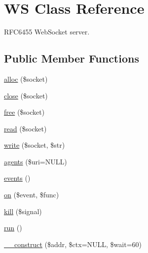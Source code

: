 \hypertarget{class_c_l_i_1_1_w_s}{}\section{WS Class Reference}
\label{class_c_l_i_1_1_w_s}


R\+F\+C6455 Web\+Socket server.  


\subsection*{Public Member Functions}
\begin{DoxyCompactItemize}
\item 
\hyperlink{class_c_l_i_1_1_w_s_a201f40e4b8683b5e569b4c1e8add9fcd}{alloc} (\$socket)
\item 
\hyperlink{class_c_l_i_1_1_w_s_aa3a3bd26af1b767091f521a6c9041e56}{close} (\$socket)
\item 
\hyperlink{class_c_l_i_1_1_w_s_a6b8891e0c2b12c863512071111b9aa07}{free} (\$socket)
\item 
\hyperlink{class_c_l_i_1_1_w_s_a845d775219b4327eb7cb626ffb1c2af3}{read} (\$socket)
\item 
\hyperlink{class_c_l_i_1_1_w_s_ac95ce2fb30c44bae1927b0107756f7e3}{write} (\$socket, \$str)
\item 
\hyperlink{class_c_l_i_1_1_w_s_a5c3b4aef24eacefe766d9e34fd5791de}{agents} (\$uri=N\+U\+LL)
\item 
\hyperlink{class_c_l_i_1_1_w_s_ade509b07f1df45730d31589b81a26efb}{events} ()
\item 
\hyperlink{class_c_l_i_1_1_w_s_a65a51fe8cfc1c6b4d04178b209b50e23}{on} (\$event, \$func)
\item 
\hyperlink{class_c_l_i_1_1_w_s_a2e5652a68528b58bda9e63311cd473bd}{kill} (\$signal)
\item 
\hyperlink{class_c_l_i_1_1_w_s_afb0fafe7e02a3ae1993c01c19fad2bae}{run} ()
\item 
\hyperlink{class_c_l_i_1_1_w_s_a19dbb10de3a82395f1c941e3f37fe8c7}{\+\_\+\+\_\+construct} (\$addr, \$ctx=N\+U\+LL, \$wait=60)
\end{DoxyCompactItemize}
